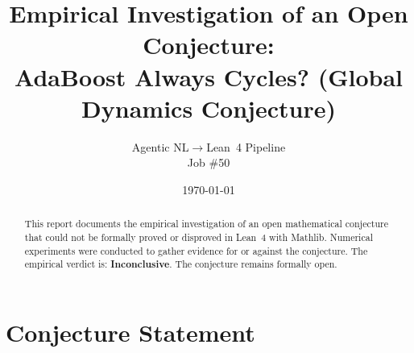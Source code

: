 \documentclass[11pt]{article}
\title{Empirical Investigation of an Open Conjecture:\\
AdaBoost Always Cycles? (Global Dynamics Conjecture)}
\author{Agentic NL$\to$Lean~4 Pipeline \\ \small Job \#50}
\date{\today}
\begin{document}
\maketitle

\begin{abstract}
This report documents the empirical investigation of an open mathematical conjecture
that could not be formally proved or disproved in Lean~4 with Mathlib.
Numerical experiments were conducted to gather evidence for or against the conjecture.
The empirical verdict is: \textbf{\textcolor{orange!80!black}{Inconclusive}}.
The conjecture remains formally open.
\end{abstract}

\section{Conjecture Statement}
\end{document}
